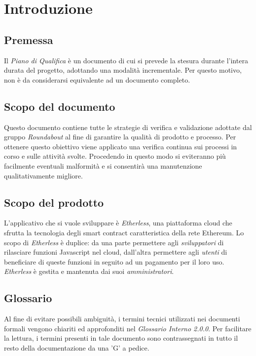 \section{Introduzione}

\subsection{Premessa}
	Il \textit{Piano di Qualifica} è un documento di cui si prevede la stesura durante l'intera durata del progetto, adottando una modalità incrementale. Per questo motivo, non è da considerarsi equivalente ad un documento completo.


\subsection{Scopo del documento}
	Questo documento contiene tutte le strategie di verifica e validazione adottate dal gruppo \textit{Roundabout} al fine di garantire la qualità di prodotto e processo. Per ottenere questo obiettivo viene applicato una verifica continua sui processi in corso e sulle attività svolte. Procedendo in questo modo si eviteranno più facilmente eventuali malformità e si consentirà una manutenzione qualitativamente migliore.


\subsection{Scopo del prodotto}
	L'applicativo che si vuole sviluppare è \textit{Etherless}, una piattaforma cloud che sfrutta la tecnologia
	degli smart contract caratteristica della rete Ethereum. Lo scopo di \textit{Etherless} è duplice: da una
	parte permettere agli \textit{sviluppatori} di rilasciare funzioni Javascript nel cloud, dall'altra
	permettere agli \textit{utenti} di beneficiare di queste funzioni in seguito ad un pagamento per il loro
	uso. \textit{Etherless} è gestita e mantenuta dai suoi \textit{amministratori}.


\subsection{Glossario}
	Al fine di evitare possibili ambiguità, i termini tecnici utilizzati nei documenti formali vengono
	chiariti ed approfonditi nel \textit{Glossario Interno 2.0.0}. Per facilitare la lettura, i termini presenti in tale documento sono contrassegnati in tutto il resto della documentazione da una 'G' a pedice.

